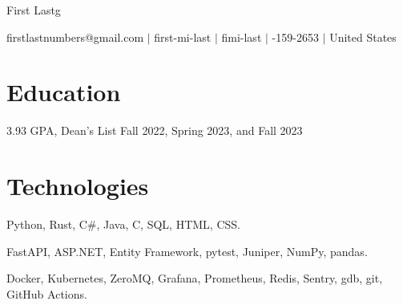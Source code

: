 \documentclass[letterpaper,11pt]{article}
\makeatletter
\newcommand{\myemail}{firstlastnumbers@gmail.com}
\newcommand{\myname}{First Lastg}
\newcommand{\mygh}{first-mi-last}
\newcommand{\mylinkedin}{fimi-last}
\newcommand{\myphone}{314-159-2653}
\newcommand{\mylocation}{United States}
\newcommand{\myemail}{jonathanzhang929@gmail.com}
\newcommand{\myname}{Jonathan Zhang}
\newcommand{\mygh}{jonathan-d-zhang}
\newcommand{\mylinkedin}{jd-zhang}
\newcommand{\myphone}{484-986-8012}
\newcommand{\mylocation}{Philadelphia, PA}
\makeatother
\begin{document}
{\Huge \myname}
\\
\vspace{2pt}

\small{
    \faEnvelope
    \thinspace \thinspace
    \myemail
    \thinspace \thinspace $|$
    \faGithub
    \thinspace \thinspace
    \mygh
    \thinspace \thinspace $|$
    \faLinkedin
    \thinspace \thinspace
    \mylinkedin
    \thinspace \thinspace $|$
    \faPhone
    \thinspace \thinspace
    \myphone
    \thinspace \thinspace $|$
    \thinspace \thinspace
    \mylocation
}

\vspace{-8pt}

\section{Education}
  \resumeSubheadingListStart
    \begin{resumeItemize}
        \item 3.93 GPA, Dean's List Fall 2022, Spring 2023, and Fall 2023
    \end{resumeItemize}
  \resumeSubheadingListEnd

\section{Technologies}
\begin{description}[nosep, left=0.15in]
    \item[Programming Languages:]
        Python,
        Rust,
        C\#,
        Java,
        C,
        SQL,
        HTML,
        CSS.
    \item[Libraries:]
        FastAPI,
        ASP.NET,
        Entity Framework,
        pytest,
        Juniper,
        NumPy,
        pandas.
    \item[Tools:]
        Docker,
        Kubernetes,
        ZeroMQ,
        Grafana,
        Prometheus,
        Redis,
        Sentry,
        gdb,
        git,
        GitHub Actions.
\end{description}
\end{document}
